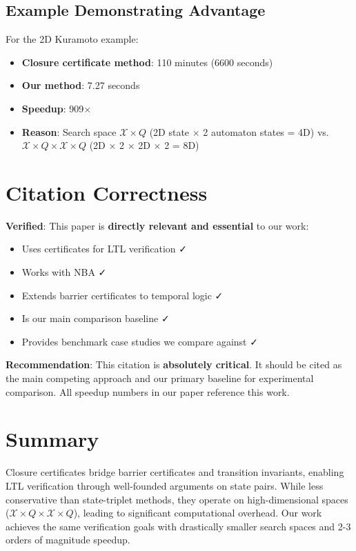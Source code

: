 \documentclass{article}
\begin{document}
\subsection{Example Demonstrating Advantage}

For the 2D Kuramoto example:
\begin{itemize}
    \item \textbf{Closure certificate method}: 110 minutes (6600 seconds)
    \item \textbf{Our method}: 7.27 seconds
    \item \textbf{Speedup}: 909×
    \item \textbf{Reason}: Search space $\mathcal{X} \times Q$ (2D state × 2 automaton states = 4D) vs. $\mathcal{X} \times Q \times \mathcal{X} \times Q$ (2D × 2 × 2D × 2 = 8D)
\end{itemize}

\section{Citation Correctness}

\textbf{Verified}: This paper is \textbf{directly relevant and essential} to our work:
\begin{itemize}
    \item Uses certificates for LTL verification ✓
    \item Works with NBA ✓
    \item Extends barrier certificates to temporal logic ✓
    \item Is our main comparison baseline ✓
    \item Provides benchmark case studies we compare against ✓
\end{itemize}

\textbf{Recommendation}: This citation is \textbf{absolutely critical}. It should be cited as the main competing approach and our primary baseline for experimental comparison. All speedup numbers in our paper reference this work.

\section{Summary}

Closure certificates bridge barrier certificates and transition invariants, enabling LTL verification through well-founded arguments on state pairs. While less conservative than state-triplet methods, they operate on high-dimensional spaces ($\mathcal{X} \times Q \times \mathcal{X} \times Q$), leading to significant computational overhead. Our work achieves the same verification goals with drastically smaller search spaces and 2-3 orders of magnitude speedup.
\end{document}
